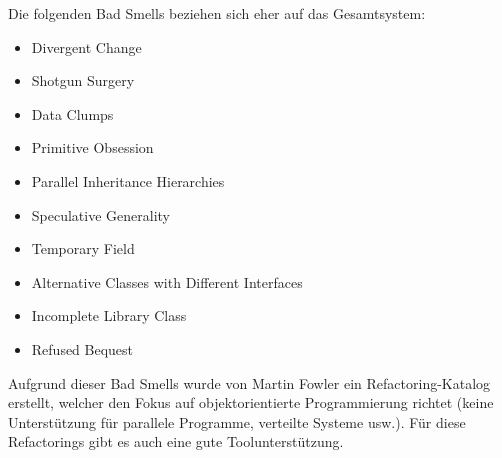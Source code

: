 Die folgenden Bad Smells beziehen sich eher auf das Gesamtsystem:
\begin{itemize}
	\item Divergent Change
	\item Shotgun Surgery
	\item Data Clumps
	\item Primitive Obsession
	\item Parallel Inheritance Hierarchies
	\item Speculative Generality
	\item Temporary Field
	\item Alternative Classes with Different Interfaces
	\item Incomplete Library Class
	\item Refused Bequest
\end{itemize}
Aufgrund dieser Bad Smells wurde von Martin Fowler ein Refactoring-Katalog erstellt, welcher den Fokus auf objektorientierte Programmierung richtet (keine Unterstützung für parallele Programme, verteilte Systeme usw.). Für diese Refactorings gibt es auch eine gute Toolunterstützung.